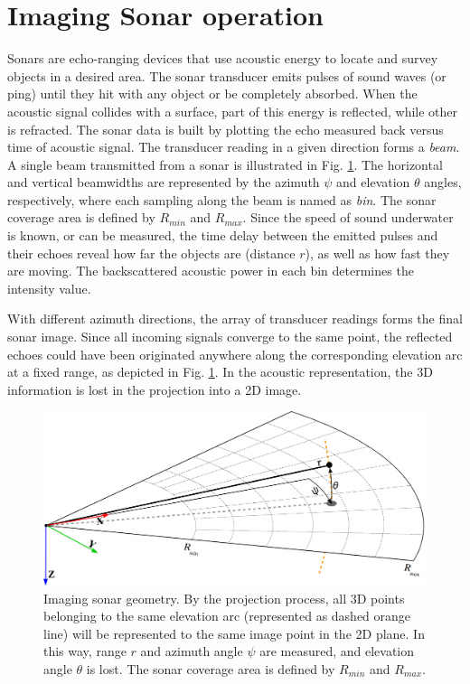 \documentclass[final,5p,times]{elsarticle}
\begin{document}

\section{Imaging Sonar operation}
\label{sonar:operation}

Sonars are echo-ranging devices that use acoustic energy to locate and survey
objects in a desired area. The sonar transducer emits pulses of sound waves
(or ping) until they hit with any object or be completely absorbed. When the
acoustic signal collides with a surface, part of this energy is reflected,
while other is refracted. The sonar data is built by plotting the echo measured
back versus time of acoustic signal. The transducer reading in a given direction
forms a \textit{beam}. A single beam transmitted from a sonar is illustrated in
Fig. \ref{fig:sonar_geometry}. The horizontal and vertical beamwidths are
represented by the azimuth $\psi$ and elevation $\theta$ angles, respectively,
where each sampling along the beam is named as \textit{bin}. The sonar coverage
area is defined by $R_{min}$ and $R_{max}$. Since the speed of sound underwater
is known, or can be measured, the time delay between the emitted pulses and
their echoes reveal how far the objects are (distance $r$), as well as how fast
they are moving. The backscattered acoustic power in each bin determines the
intensity value.

With different azimuth directions, the array of transducer readings forms the
final sonar image. Since all incoming signals converge to the same point, the
reflected echoes could have been originated anywhere along the corresponding
elevation arc at a fixed range, as depicted in Fig. \ref{fig:sonar_geometry}.
In the acoustic representation, the 3D information is lost in the projection
into a 2D image.

\begin{figure}[t]
    \includegraphics[width=\columnwidth]{figs/sonar_geometry_2}
    \centering
    \captionsetup{justification=centering}
    \caption{Imaging sonar geometry. By the projection process, all 3D points
    belonging to the same elevation arc (represented as dashed orange line) will
    be represented to the same image point in the 2D plane. In this way,
    range $r$ and azimuth angle $\psi$ are measured, and elevation
    angle $\theta$ is lost. The sonar coverage area is defined by $R_{min}$
    and $R_{max}$.}
    \label{fig:sonar_geometry}
\end{figure}
\end{document}
